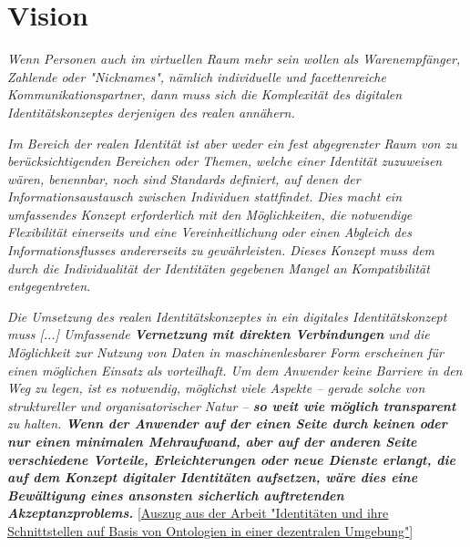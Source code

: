 
\section{Vision}
\label{sec:vision}


\vspace{0.3cm}

\textit{Wenn Personen auch im virtuellen Raum mehr sein wollen als Warenempfänger,
Zahlende oder "Nicknames", nämlich individuelle und facettenreiche Kommunikationspartner, dann muss sich die Komplexität des digitalen Identitätskonzeptes derjenigen
des realen annähern.}

\textit{Im Bereich der realen Identität ist aber weder ein fest abgegrenzter Raum von zu berücksichtigenden Bereichen oder Themen, welche einer Identität zuzuweisen wären, benennbar, noch sind Standards definiert, auf denen der Informationsaustausch zwischen
Individuen stattfindet. Dies macht ein umfassendes Konzept erforderlich mit den Möglichkeiten, die notwendige Flexibilität einerseits und eine Vereinheitlichung oder einen Abgleich des Informationsflusses andererseits zu gewährleisten. Dieses Konzept muss
dem durch die Individualität der Identitäten gegebenen Mangel an Kompatibilität entgegentreten.} 

\textit{Die Umsetzung des realen Identitätskonzeptes in ein digitales Identitätskonzept muss [...] Umfassende \textbf{Vernetzung mit direkten Verbindungen} und
die Möglichkeit zur Nutzung von Daten in maschinenlesbarer Form erscheinen für einen möglichen Einsatz als vorteilhaft. Um dem Anwender keine Barriere in den Weg
zu legen, ist es notwendig, möglichst viele Aspekte – gerade solche von struktureller und
organisatorischer Natur – \textbf{so weit wie möglich transparent} zu halten. \textbf{Wenn der Anwender auf der einen Seite durch keinen oder nur einen minimalen Mehraufwand, aber auf der anderen Seite verschiedene Vorteile, Erleichterungen oder neue Dienste erlangt, die auf dem Konzept digitaler Identitäten aufsetzen, wäre dies eine Bewältigung eines ansonsten sicherlich auftretenden Akzeptanzproblems.}} [\href{https://vsis-www.informatik.uni-hamburg.de/getDoc.php/thesis/47/DA_Gordian_Kaulbarsch.pdf}{Auszug aus der Arbeit "Identitäten und ihre Schnittstellen auf Basis von Ontologien in einer dezentralen Umgebung"}]

\vspace{0.3cm}

